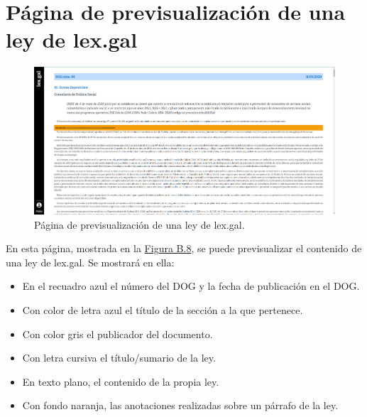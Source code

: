 \section{Página de previsualización de una ley de lex.gal}
\label{PPrevisualizacionLexGal}

\begin{figure}[H]
\centerline{\includegraphics[width=15cm]{figuras/manualUsuario/PrevisualizarLEXGAL.PNG}}
\caption{Página de previsualización de una ley de lex.gal.}
\label{enlacePrevisualizacionLexGal}
\end{figure}

En esta página, mostrada en la \hyperref[enlacePrevisualizacionLexGal]{Figura B.8}, se puede previsualizar el contenido de una ley de lex.gal. Se mostrará en ella:
\begin{itemize}
    \item En el recuadro azul el número del DOG y la fecha de publicación en el DOG.
    \item Con color de letra azul el título de la sección a la que pertenece.
    \item Con color gris el publicador del documento.
    \item Con letra cursiva el título/sumario de la ley.
    \item En texto plano, el contenido de la propia ley.
    \item Con fondo naranja, las anotaciones realizadas sobre un párrafo de la ley.
\end{itemize}